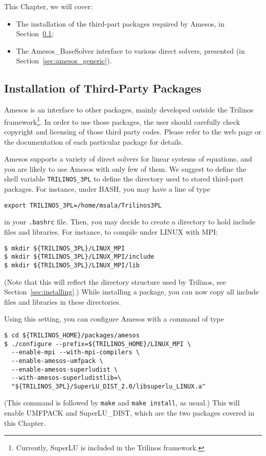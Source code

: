 This Chapter, we will cover:
\begin{itemize}
\item The installation of the third-part packages required by Amesos, in
  Section~\ref{sec:3pl};
\item The Amesos\_BaseSolver interface to various direct solvers,
  presented (in Section~\ref{sec:amesos_generic}).
\end{itemize}


\subsection{Installation of Third-Party Packages}
\label{sec:3pl}

Amesos is an interface to other packages, mainly developed outside the
Trilinos framework\footnote{Currently, SuperLU is included in the
  Trilinos framework.}. In order to use those packages, the user should
carefully check copyright and licensing of those third party codes.
Please refer to the web page or the documentation of each particular
package for details.

Amesos supports a variety of direct solvers for linear systems of
equations, and you are likely to use Amesos with only few of them. We
suggest to define the shell variable \verb!TRILINOS_3PL!  to define the
directory used to stored third-part packages. For instance, under BASH,
you may have a line of type
\begin{verbatim}
export TRILINOS_3PL=/home/msala/Trilinos3PL
\end{verbatim}
in your \verb!.bashrc! file. Then, you may decide to create a directory
to hold include files and libraries. For instance, to compile under
LINUX with MPI:
\begin{verbatim}
$ mkdir ${TRILINOS_3PL}/LINUX_MPI
$ mkdir ${TRILINOS_3PL}/LINUX_MPI/include
$ mkdir ${TRILINOS_3PL}/LINUX_MPI/lib
\end{verbatim}
(Note that this will reflect the directory structure used by Trilinos,
see Section~\ref{sec:installing}.) While installing a package, you can
now copy all include files and libraries in these directories.

Using this setting, you can configure Amesos with a command of type
\begin{verbatim}
$ cd ${TRILINOS_HOME}/packages/amesos
$ ./configure --prefix=${TRILINOS_HOME}/LINUX_MPI \
  --enable-mpi --with-mpi-compilers \
  --enable-amesos-umfpack \
  --enable-amesos-superludist \
  --with-amesos-superludistlib=\
  "${TRILINOS_3PL}/SuperLU_DIST_2.0/libsuperlu_LINUX.a"
\end{verbatim}
(This command is followed by \verb!make! and \verb!make install!, as
usual.)  This will enable UMFPACK and SuperLU\_DIST, which are the two
packages covered in this Chapter.

